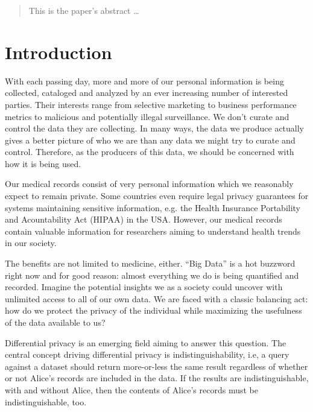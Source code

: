 \documentclass[12pt]{article}
\begin{document}
\maketitle

\lstset{language=Haskell,basicstyle=\footnotesize,frame=single,
        numbers=left}

\begin{abstract}
This is the paper's abstract \ldots
\end{abstract}


\section{Introduction}\label{sec:introduction}

With each passing day, more and more of our personal information is being collected, cataloged and analyzed by an ever increasing number of interested parties.
Their interests range from selective marketing to business performance metrics to malicious and potentially illegal surveillance.
We don't curate and control the data they are collecting.
In many ways, the data we produce actually gives a better picture of who we are than any data we might try to curate and control.
Therefore, as the producers of this data, we should be concerned with how it is being used.

Our medical records consist of very personal information which we reasonably expect to remain private.
Some countries even require legal privacy guarantees for systems maintaining sensitive information, e.g. the Health Insurance Portability and Acountability Act (HIPAA) in the USA.
However, our medical records contain valuable information for researchers aiming to understand health trends in our society.

The benefits are not limited to medicine, either.
``Big Data'' is a hot buzzword right now and for good reason: almost everything we do is being quantified and recorded.
Imagine the potential insights we as a society could uncover with unlimited access to all of our own data.
We are faced with a classic balancing act: how do we protect the privacy of the individual while maximizing the usefulness of the data available to us?

Differential privacy\cite{journals/cacm/Dwork11} is an emerging field aiming to answer this question.
The central concept driving differential privacy is indistinguishability, i.e, a query against a dataset should return more-or-less the same result regardless of whether or not Alice's records are included in the data.
If the results are indistinguishable, with and without Alice, then the contents of Alice's records must be indistinguishable, too.
\end{document}
